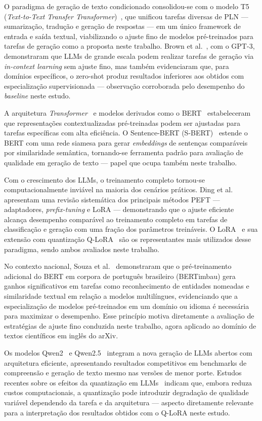 
O paradigma de geração de texto condicionado consolidou-se com o modelo T5 (\textit{Text-to-Text Transfer Transformer})~\cite{raffel_exploring_2020}, que unificou tarefas diversas de PLN — sumarização, tradução e geração de respostas — em um único framework de entrada e saída textual, viabilizando o ajuste fino de modelos pré-treinados para tarefas de geração como a proposta neste trabalho. Brown et al.~\cite{brown_language_2020}, com o GPT-3, demonstraram que LLMs de grande escala podem realizar tarefas de geração via \textit{in-context learning} sem ajuste fino, mas também evidenciaram que, para domínios específicos, o zero-shot produz resultados inferiores aos obtidos com especialização supervisionada — observação corroborada pelo desempenho do \textit{baseline} neste estudo.

A arquitetura \textit{Transformer}~\cite{vaswani_attention_2017} e modelos derivados como o BERT~\cite{devlin_bert_2019} estabeleceram que representações contextualizadas pré-treinadas podem ser ajustadas para tarefas específicas com alta eficiência. O Sentence-BERT (S-BERT)~\cite{reimers_sentence-bert_2019} estende o BERT com uma rede siamesa para gerar \textit{embeddings} de sentenças comparáveis por similaridade semântica, tornando-se ferramenta padrão para avaliação de qualidade em geração de texto — papel que ocupa também neste trabalho.

Com o crescimento dos LLMs, o treinamento completo tornou-se computacionalmente inviável na maioria dos cenários práticos. Ding et al.~\cite{ding_parameter-efficient_2023} apresentam uma revisão sistemática dos principais métodos PEFT — adaptadores, \textit{prefix-tuning} e LoRA — demonstrando que o ajuste eficiente alcança desempenho comparável ao treinamento completo em tarefas de classificação e geração com uma fração dos parâmetros treináveis. O LoRA~\cite{hu_lora_2022} e sua extensão com quantização Q-LoRA~\cite{dettmers_qlora_2023} são os representantes mais utilizados desse paradigma, sendo ambos avaliados neste trabalho.

No contexto nacional, Souza et al.~\cite{souza_bertimbau_2020} demonstraram que o pré-treinamento adicional do BERT em corpora de português brasileiro (BERTimbau) gera ganhos significativos em tarefas como reconhecimento de entidades nomeadas e similaridade textual em relação a modelos multilíngues, evidenciando que a especialização de modelos pré-treinados em um domínio ou idioma é necessária para maximizar o desempenho. Esse princípio motiva diretamente a avaliação de estratégias de ajuste fino conduzida neste trabalho, agora aplicado ao domínio de textos científicos em inglês do arXiv.

Os modelos Qwen2~\cite{yang_qwen2_2024} e Qwen2.5~\cite{team_qwen25_2024} integram a nova geração de LLMs abertos com arquitetura eficiente, apresentando resultados competitivos em benchmarks de compreensão e geração de texto mesmo nas versões de menor porte. Estudos recentes sobre os efeitos da quantização em LLMs~\cite{shi_systematic_2025} indicam que, embora reduza custos computacionais, a quantização pode introduzir degradação de qualidade variável dependendo da tarefa e da arquitetura — aspecto diretamente relevante para a interpretação dos resultados obtidos com o Q-LoRA neste estudo.
